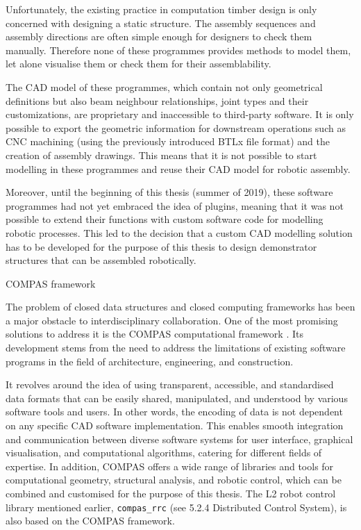 Unfortunately, the existing practice in computation timber design is only concerned with designing a static structure. The assembly sequences and assembly directions are often simple enough for designers to check them manually. Therefore none of these programmes provides methods to model them, let alone visualise them or check them for their assemblability. 

The CAD model of these programmes, which contain not only geometrical definitions but also beam neighbour relationships, joint types and their customizations, are proprietary and inaccessible to third-party software. It is only possible to export the geometric information for downstream operations such as CNC machining (using the previously introduced BTLx file format) and the creation of assembly drawings. This means that it is not possible to start modelling in these programmes and reuse their CAD model for robotic assembly. 

Moreover, until the beginning of this thesis (summer of 2019), these software programmes had not yet embraced the idea of plugins, meaning that it was not possible to extend their functions with custom software code for modelling robotic processes. This led to the decision that a custom CAD modelling solution has to be developed for the purpose of this thesis to design demonstrator structures that can be assembled robotically.

COMPAS framework

The problem of closed data structures and closed computing frameworks has been a major obstacle to interdisciplinary collaboration. One of the most promising solutions to address it is the COMPAS computational framework \parencite{meleCOMPASFrameworkComputational2017}. Its development stems from the need to address the limitations of existing software programs in the field of architecture, engineering, and construction.

It revolves around the idea of using transparent, accessible, and standardised data formats that can be easily shared, manipulated, and understood by various software tools and users. In other words, the encoding of data is not dependent on any specific CAD software implementation. This enables smooth integration and communication between diverse software systems for user interface, graphical visualisation, and computational algorithms, catering for different fields of expertise. In addition, COMPAS offers a wide range of libraries and tools for computational geometry, structural analysis, and robotic control, which can be combined and customised for the purpose of this thesis. The L2 robot control library mentioned earlier, \verb|compas_rrc| \parencite{fleischmannCOMPASRRCOnline2020} (see 5.2.4 Distributed Control System), is also based on the COMPAS framework.

